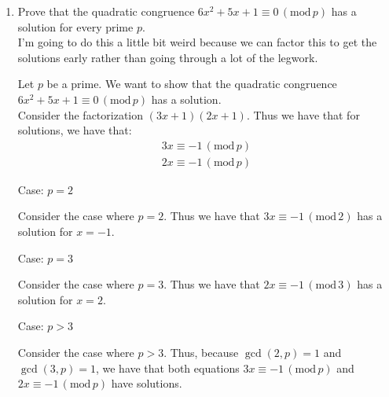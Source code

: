 \documentclass[10pt,oneside]{book}
\newcommand{\gspc}{\vspace{0.13cm}} %
\newcommand{\gline}{\gspc\\} %
\newcommand{\gmod}[1]{\,(\text{mod}\,#1)}
\newcommand{\centerit}[1]{{\begin{center} #1 \end{center}}}
\let\endoldproof\endproof
\renewenvironment{proof}[1][\proofname]
  {\vspace{0.2cm}\begin{adjustwidth}{2em}{2em}
   \oldproof[#1]}
  {\endoldproof
\end{adjustwidth}}
\newenvironment{problem}[1]
  {\vspace{-0.1cm}\begin{coloredadjust}\begin{adjustwidth}{2em}{2em}
   \textit{Problem. }#1}
  {\endoldproof
\end{adjustwidth}\end{coloredadjust}\gspc}
\begin{document}
\begin{enumerate}
\begin{enumerate}
\begin{problem}
\begin{align*}
        y &= 10x+ 6\\
        d &= 16
      \end{align*}
      Trying out various $y$ values gives us that $y = 4$. Solving for $x$ gives that $10x + 6 \equiv 4\gmod{23}$. Thus, $10x\equiv 21\gmod{23}$, and thus using the euclidean:
      \begin{align*}
        23 &= 2(10) + 3\\
        10 &= 3(3) + 1\\
        3 &= 3(1) + 0
      \end{align*}
      With reverse:
      \begin{align*}
        10 - 3(3) &= 1\\
        10-3(23 - 2(10)) &= 1\\
        7(10) - 3(23) &= 1
      \end{align*}
      Gives us that 
      $x = 7\cdot 21 = 147 \equiv 9\gmod{23}$. Thus one of our solutions is $x = 9$. \gline 
      The other solution is given from $10x + 6 = -4$, such that $10x \equiv -10\gmod{23}$. This very simply gives $x = -1 \equiv 22 \gmod{23}$, \gline
      Thus our two solutions are $x =9, x = 22$. 
    \end{problem}
	\end{enumerate}
  \item Prove that the quadratic congruence $6x^2 + 5x + 1 \equiv 0\gmod{p}$ has a solution for every prime $p$. \gline
  I'm going to do this a little bit weird because we can factor this to get the solutions early rather than going through a lot of the legwork. 
  \begin{proof}
    Let $p$ be a prime. We want to show that the quadratic congruence $6x^2 + 5x + 1 \equiv 0\gmod{p}$ has a solution.\gline
    Consider the factorization $(3x+1)(2x+1)$. Thus we have that for solutions, we have that:
    \begin{align*}
      3x \equiv -1 \gmod{p}\\
      2x \equiv -1 \gmod{p}
    \end{align*}
    \centerit{Case: $p = 2$}
    Consider the case where $p = 2$. Thus we have that $3x\equiv -1\gmod{2}$ has a solution for $x = -1$. 
    \centerit{Case: $p =3$}
    Consider the case where $p = 3$. Thus we have that $2x \equiv -1\gmod{3}$ has a solution for $x = 2$. 
    \centerit{Case: $p > 3$}
    Consider the case where $p>3$. Thus, because $\gcd(2, p)=1$ and $\gcd(3,p) = 1$, we have that both equations $3x \equiv -1 \gmod{p}$ and $2x \equiv -1\gmod{p}$ have solutions. \gline

\end{proof}
\end{enumerate}
\end{document}
